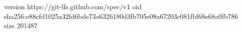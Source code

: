 version https://git-lfs.github.com/spec/v1
oid sha256:e88cfd1025a32fd6bde73a6326180d3fb705e08a67203c081fbf68e68a0fb786
size 201487
